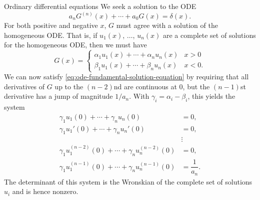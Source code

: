 \begin{Example}{Ordinary differential equations}
\label{ex:ode-fundamental-solution}
We seek a solution to the ODE
\begin{equation}\label{eq:ode-fundamental-solution-equation}
a_nG^{(n)}(x)+\cdots+a_0G(x)=\delta(x).
\end{equation}
For both positive and negative $x$, $G$ must agree with a solution of the homogeneous ODE. That is, if $u_1(x)$, $\ldots$, $u_n(x)$ are a complete set of solutions for the homogeneous ODE, then we must have
\begin{equation}\label{eq:ode-fundamental-solution-piecewise-basis}
G(x)=\begin{cases}\alpha_1u_1(x)+\cdots+\alpha_nu_n(x)&x>0\\\beta_1u_1(x)+\cdots+\beta_nu_n(x)&x<0.\end{cases}
\end{equation}
We can now satisfy \eqref{eq:ode-fundamental-solution-equation} by requiring that all derivatives of $G$ up to the $(n-2)$nd are continuous at 0, but the $(n-1)$st derivative has a jump of magnitude $1/a_n$. With $\gamma_i=\alpha_i-\beta_i$, this yields the system
\begin{equation}\label{eq:ode-fundamental-solution-jump-system}
\begin{aligned}
\gamma_1u_1(0)+\cdots+\gamma_nu_n(0)&=0,\\
\gamma_1u_1'(0)+\cdots+\gamma_nu_n'(0)&=0,\\
&\vdots\\
\gamma_1u_1^{(n-2)}(0)+\cdots+\gamma_nu_n^{(n-2)}(0)&=0,\\
\gamma_1u_1^{(n-1)}(0)+\cdots+\gamma_nu_n^{(n-1)}(0)&=\dfrac1{a_n}.
\end{aligned}
\end{equation}
The determinant of this system is the Wronskian of the complete set of solutions $u_i$ and is hence nonzero.
\end{Example}

